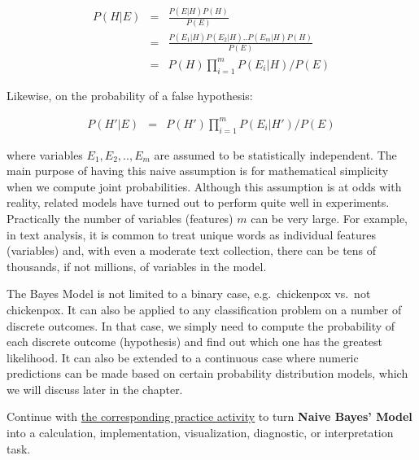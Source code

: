 \documentclass[
  letterpaper,
]{scrbook}
\begin{document}
\[\begin{aligned}
P(H|E)  & = & \frac{P(E|H) P(H)}{P(E)} \\
        & = & \frac{P(E_1|H) P(E_2|H)..P(E_m|H) P(H)}{P(E)} \\
        & = & P(H) \prod_{i=1}^{m} P(E_i|H) / P(E)
\end{aligned}\]

Likewise, on the probability of a false hypothesis:

\[\begin{aligned}
P(H'|E)  & = & P(H') \prod_{i=1}^{m} P(E_i|H') / P(E)
\end{aligned}\]

where variables \(E_1, E_2, .., E_m\) are assumed to be statistically
independent. The main purpose of having this naive assumption is for
mathematical simplicity when we compute joint probabilities. Although
this assumption is at odds with reality, related models have turned out
to perform quite well in experiments. Practically the number of
variables (features) \(m\) can be very large. For example, in text
analysis, it is common to treat unique words as individual features
(variables) and, with even a moderate text collection, there can be tens
of thousands, if not millions, of variables in the model.

The Bayes Model is not limited to a binary case, e.g.~chickenpox vs.~not
chickenpox. It can also be applied to any classification problem on a
number of discrete outcomes. In that case, we simply need to compute the
probability of each discrete outcome (hypothesis) and find out which one
has the greatest likelihood. It can also be extended to a continuous
case where numeric predictions can be made based on certain probability
distribution models, which we will discuss later in the chapter.

\begin{tcolorbox}[enhanced jigsaw, arc=.35mm, bottomrule=.15mm, bottomtitle=1mm, breakable, colback=white, colbacktitle=quarto-callout-tip-color!10!white, colframe=quarto-callout-tip-color-frame, coltitle=black, left=2mm, leftrule=.75mm, opacityback=0, opacitybacktitle=0.6, rightrule=.15mm, title=\textcolor{quarto-callout-tip-color}{\faLightbulb}\hspace{0.5em}{Put it into practice}, titlerule=0mm, toprule=.15mm, toptitle=1mm]

Continue with \hyperref[sec-pr-04-naive-bayes-model]{the corresponding
practice activity} to turn \textbf{Naive Bayes' Model} into a
calculation, implementation, visualization, diagnostic, or
interpretation task.

\end{tcolorbox}
\end{document}
